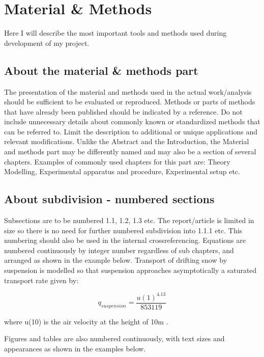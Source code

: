 \documentclass[a4paper,12pt]{extarticle}
\begin{document}
\section{Material \& Methods}
Here I will describe the most important tools and methods used during development of my project.




\subsection{About the material \& methods part}
The presentation of the material and methods used in the actual work/analysis should be sufficient to be evaluated or reproduced. Methods or parts of methods that have already been published should be indicated by a reference. Do not include unnecessary details about commonly known or standardized methods that can be referred to. Limit the description to additional or unique applications and relevant modifications. Unlike the Abstract and the Introduction, the Material and methods part may be differently named and may also be a section of several chapters. Examples of commonly used chapters for this part are: Theory Modelling, Experimental apparatus and procedure, Experimental setup etc.

\subsection{About subdivision - numbered sections}
Subsections are to be numbered 1.1, 1.2, 1.3 etc. The report/article is limited in size so there is no need for further numbered subdivision into 1.1.1 etc. This numbering should also be used in the internal crossreferencing. Equations are numbered continuously by integer number regardless of sub chapters, and arranged as shown in the example below. Transport of drifting snow by suspension is modelled so that suspension approaches asymptotically a saturated transport rate given by:

\begin{equation}
  q_{suspension} = \frac{u(1)^{4.13}}{853119}
  \label{eq:FirstEquation}
\end{equation}

where u(10) is the air velocity at the height of 10m \citep{Tabler1990}.

Figures and tables are also numbered continuously, with text sizes and appearances as shown in the examples below. 
\end{document}
